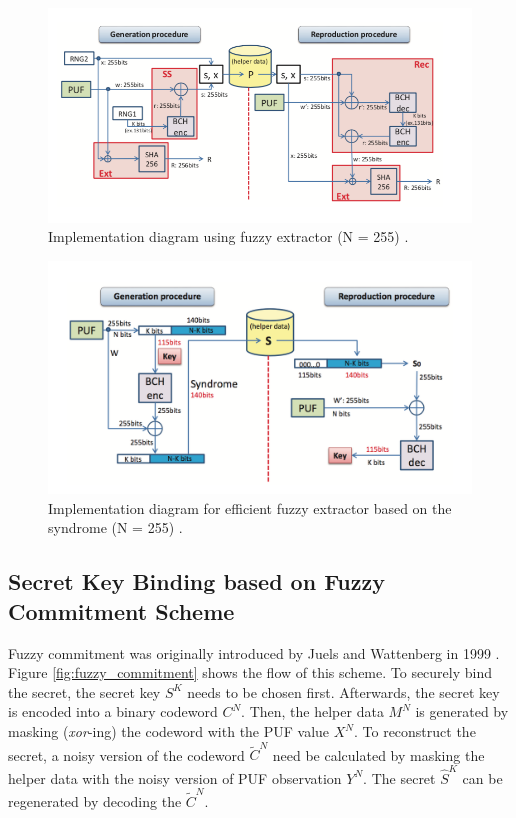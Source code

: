 \begin{figure}[tph!]
    \centerline{\includegraphics[width={\textwidth}]{images/crypt_key_generation_old}}
    \caption{Implementation diagram using fuzzy extractor (N = 255) \cite{cryptographic_key_generation_old}.}
    \label{fig:cryptographic_key_generation_old}
\end{figure}

\begin{figure}[tph!]
    \centerline{\includegraphics[width={\textwidth}]{images/crypt_key_generation}}
    \caption{Implementation diagram for efficient fuzzy extractor based on the syndrome (N = 255) \cite{cryptographic_key_generation}.}
    \label{fig:cryptographic_key_generation}
\end{figure}

\subsection{Secret Key Binding based on Fuzzy Commitment Scheme}
Fuzzy commitment was originally introduced by Juels and Wattenberg in 1999 \cite{Juels:1999:FCS:319709.319714}. Figure \ref{fig:fuzzy_commitment} shows the flow of this scheme.
To securely bind the secret, the secret key $S^K$ needs to be chosen first. Afterwards, the secret key is encoded into a binary codeword $C^N$. Then, the helper data $M^N$ is generated by masking (\textit{xor}-ing) the codeword with the PUF value $X^N$.
To reconstruct the secret, a noisy version of the codeword $\widetilde{C}^N$ need be calculated by masking the helper data with the noisy version of PUF observation $Y^N$. The secret $\widehat{S}^K$ can be regenerated by decoding the $\widetilde{C}^N$.


